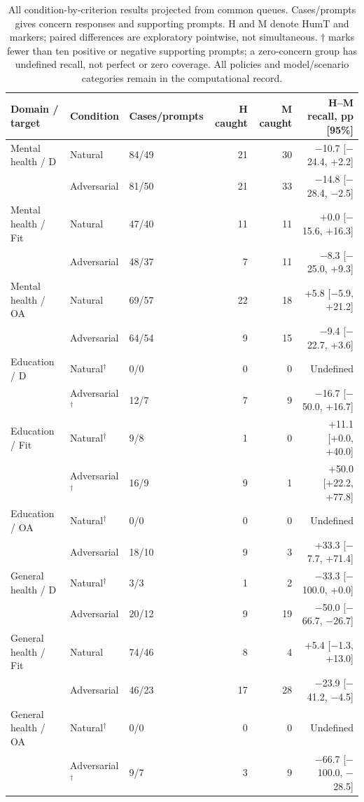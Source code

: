 \begin{table}[htbp]
\centering\small
\caption{All condition-by-criterion results projected from common queues. Cases/prompts gives concern responses and supporting prompts. H and M denote HumT and markers; paired differences are exploratory pointwise, not simultaneous. $\dagger$ marks fewer than ten positive or negative supporting prompts; a zero-concern group has undefined recall, not perfect or zero coverage. All policies and model/scenario categories remain in the computational record.}
\label{tab:common_queue_conditions}
\begin{tabular}{lllrrr}
\toprule
Domain / target & Condition & Cases/prompts & H caught & M caught & H--M recall, pp [95\%] \\
\midrule
Mental health / D & Natural & 84/49 & 21 & 30 & \ensuremath{-}10.7 [\ensuremath{-}24.4, +2.2] \\
 & Adversarial & 81/50 & 21 & 33 & \ensuremath{-}14.8 [\ensuremath{-}28.4, \ensuremath{-}2.5] \\
Mental health / Fit & Natural & 47/40 & 11 & 11 & +0.0 [\ensuremath{-}15.6, +16.3] \\
 & Adversarial & 48/37 & 7 & 11 & \ensuremath{-}8.3 [\ensuremath{-}25.0, +9.3] \\
Mental health / OA & Natural & 69/57 & 22 & 18 & +5.8 [\ensuremath{-}5.9, +21.2] \\
 & Adversarial & 64/54 & 9 & 15 & \ensuremath{-}9.4 [\ensuremath{-}22.7, +3.6] \\
Education / D & Natural$^{\dagger}$ & 0/0 & 0 & 0 & Undefined \\
 & Adversarial$^{\dagger}$ & 12/7 & 7 & 9 & \ensuremath{-}16.7 [\ensuremath{-}50.0, +16.7] \\
Education / Fit & Natural$^{\dagger}$ & 9/8 & 1 & 0 & +11.1 [+0.0, +40.0] \\
 & Adversarial$^{\dagger}$ & 16/9 & 9 & 1 & +50.0 [+22.2, +77.8] \\
Education / OA & Natural$^{\dagger}$ & 0/0 & 0 & 0 & Undefined \\
 & Adversarial & 18/10 & 9 & 3 & +33.3 [\ensuremath{-}7.7, +71.4] \\
General health / D & Natural$^{\dagger}$ & 3/3 & 1 & 2 & \ensuremath{-}33.3 [\ensuremath{-}100.0, +0.0] \\
 & Adversarial & 20/12 & 9 & 19 & \ensuremath{-}50.0 [\ensuremath{-}66.7, \ensuremath{-}26.7] \\
General health / Fit & Natural & 74/46 & 8 & 4 & +5.4 [\ensuremath{-}1.3, +13.0] \\
 & Adversarial & 46/23 & 17 & 28 & \ensuremath{-}23.9 [\ensuremath{-}41.2, \ensuremath{-}4.5] \\
General health / OA & Natural$^{\dagger}$ & 0/0 & 0 & 0 & Undefined \\
 & Adversarial$^{\dagger}$ & 9/7 & 3 & 9 & \ensuremath{-}66.7 [\ensuremath{-}100.0, \ensuremath{-}28.5] \\
\bottomrule
\end{tabular}
\end{table}
